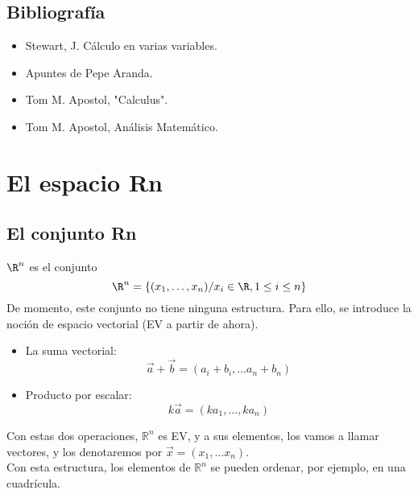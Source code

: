 \documentclass{../Calculo.tex}
\begin{document}
\section{Bibliografía}
\begin{itemize}
	\item Stewart, J. Cálculo en varias variables.
	\item Apuntes de Pepe Aranda.
	\item Tom M. Apostol, "Calculus".
	\item Tom M. Apostol, Análisis Matemático.
\end{itemize}
\pagebreak
\chapter{El espacio Rn}
\section{El conjunto Rn}
$\R^{n}$ es el conjunto
\[
		\R^{n} =\{ ( x_1,\dots ,x_{n}) / x_{i} \in \R, 1 \leq i \leq n\}
\]
De momento, este conjunto no tiene ninguna estructura. Para ello, se introduce
la noción de espacio vectorial (EV a partir de ahora).
\begin{itemize}
	\item La suma vectorial:
	\[
		\vec{a} + \vec{b} = (a_{i}+b_{i},\dots a_{n}+b_{n})	
	\]
	\item Producto por escalar:
		\[
			k \vec{a} = (ka_{1},\dots ,ka_{n})
		\]
\end{itemize}
Con estas dos operaciones, $\mathbb{R}^{n}$ es EV, y a sus elementos, los vamos a
llamar vectores, y los denotaremos por $\vec{x}=(x_{1},\dots x_{n})$.\\
Con esta estructura, los elementos de $\mathbb{R}^{n}$ se pueden ordenar, por
ejemplo, en una cuadrícula.
\begin{center}


\end{center}
\end{document}
